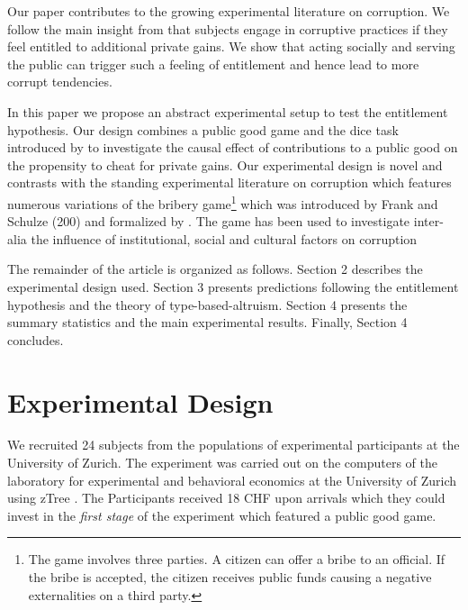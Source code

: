 \documentclass[12pt, a4paper]{article}
\begin{document}
Our paper contributes to the growing experimental literature on corruption. We follow the main insight from \citet{Banerjee2016On} that subjects engage in corruptive practices if they feel entitled to additional private gains. We show that acting socially and serving the public can trigger such a feeling of entitlement and hence lead to more corrupt tendencies.

In this paper we propose an abstract experimental setup to test the entitlement hypothesis. Our design combines a public good game and the dice task introduced by \citet{Fischbacher2013Lies} to investigate the causal effect of contributions to a public good on the propensity to cheat for private gains.
Our experimental design is novel and contrasts with the standing experimental literature on corruption which features numerous variations of the bribery game\footnote{The game involves three parties. A citizen can offer a bribe to an official. If the bribe is accepted, the citizen receives public funds causing a negative externalities on a third party.} which was introduced by Frank and Schulze (200) and formalized by \citet{Abbink2002Experimental}. The game has been used to investigate inter-alia the influence of institutional, social and cultural factors on corruption \citep{Banerjee2016On}

The remainder of the article is organized as follows. Section 2 describes the experimental design used. Section 3 presents predictions following the entitlement hypothesis and the theory of type-based-altruism. Section 4 presents the summary statistics and the main experimental results. Finally, Section 4 concludes.

\section{Experimental Design}
We recruited 24 subjects from the populations of experimental participants at the University of Zurich. The experiment was carried out on the computers of the laboratory for experimental and behavioral economics at the University of Zurich using zTree \citep{Fischbacher2007ZTree}. The Participants received 18 CHF upon arrivals which they could invest in the \emph{first stage} of the experiment which featured a public good game.
\end{document}

